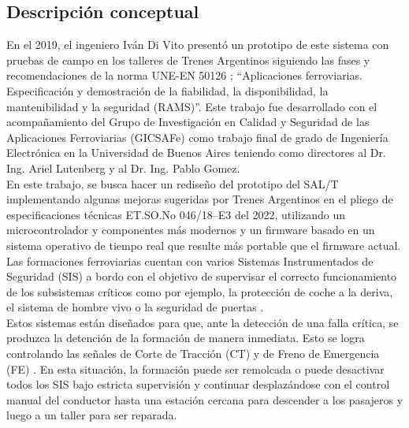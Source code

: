 

\subsection{Descripción conceptual}

En el 2019, el ingeniero Iván Di Vito presentó un prototipo de este sistema \cite{salt_ivan} con pruebas de campo en los talleres de Trenes Argentinos \cite{trenes_arg} siguiendo las fases y recomendaciones de la norma UNE-EN 50126 \cite{norma_50126};  ``Aplicaciones ferroviarias. Especificación y demostración de la fiabilidad, la disponibilidad, la mantenibilidad y la seguridad (RAMS)''. Este trabajo fue desarrollado con el acompañamiento del Grupo de Investigación en Calidad y Seguridad de las Aplicaciones Ferroviarias (GICSAFe) \cite{gicsafe} como trabajo final de grado de Ingeniería Electrónica en la Universidad de Buenos Aires teniendo como directores al Dr. Ing. Ariel Lutenberg y al Dr. Ing. Pablo Gomez. \\

En este trabajo, se busca hacer un rediseño del prototipo del SAL/T implementando algunas mejoras sugeridas por Trenes Argentinos en el pliego de especificaciones técnicas ET.SO.No 046/18–E3 \cite{spec} del 2022, utilizando un microcontrolador y componentes más modernos y un firmware basado en un sistema operativo de tiempo real que resulte más portable que el firmware actual. \\

Las formaciones ferroviarias cuentan con varios Sistemas Instrumentados de Seguridad (SIS) a bordo con el objetivo de supervisar el correcto funcionamiento de los subsistemas críticos como por ejemplo, la protección de coche a la deriva, el sistema de hombre vivo o la seguridad de puertas \cite{salt_paper}. \\

Estos sistemas están diseñados para que, ante la detección de una falla crítica, se produzca la detención de la formación de manera inmediata. Esto se logra controlando las señales de Corte de Tracción (CT) y de Freno de Emergencia (FE) \cite{salt_paper}. En esta situación, la formación puede ser remolcada o puede desactivar todos los SIS bajo estricta supervisión y continuar desplazándose con el control manual del conductor hasta una estación cercana para descender a los pasajeros y luego a un taller para ser reparada. \\

